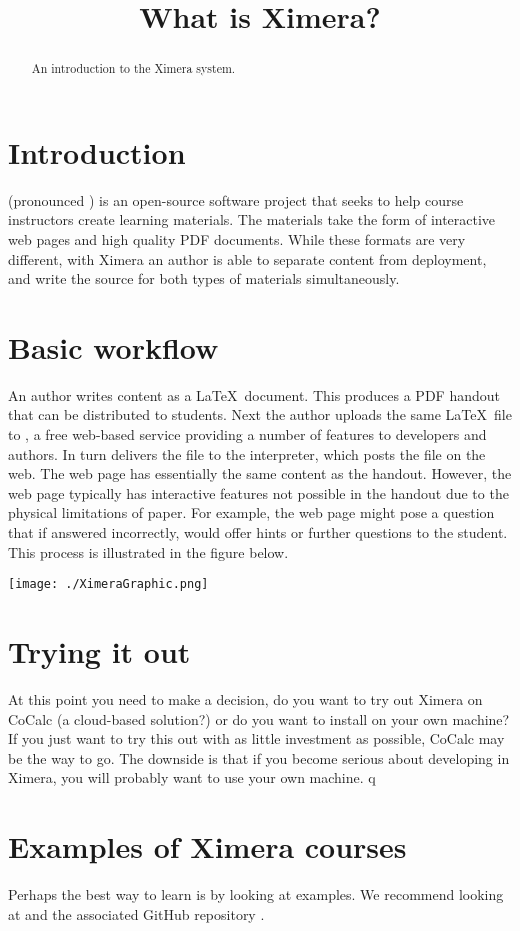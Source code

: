 \documentclass{ximera}
\title{What is Ximera?}
\begin{document}
\begin{abstract}
An introduction to the Ximera system.
\end{abstract}
\maketitle


\section{Introduction}

 (pronounced ) is an
open-source software project that seeks to help course instructors
create learning materials.  The materials take the form of interactive
web pages and high quality PDF documents.  While these formats are
very different, with Ximera an author is able to separate content from
deployment, and write the source for both types of materials
simultaneously.

\section{Basic workflow}

An author writes content as a \LaTeX\ document.  This produces a PDF
handout that can be distributed to students.  Next the author uploads
the same \LaTeX\ file to , a free
web-based service providing a number of features to developers and
authors.  In turn  delivers the
file to the  interpreter, which
  posts the file on the web.  The web page has essentially the same
  content as the handout.  However, the web page typically has
  interactive features not possible in the handout due to the physical
  limitations of paper.  For example, the web page might pose a
  question that if answered incorrectly, would offer hints or further
  questions to the student.  This process is illustrated in the figure
  below.

\begin{image}
\texttt{[image: ./XimeraGraphic.png]}
\end{image}

\section{Trying it out}

At this point you need to make a decision, do you want to try out
Ximera on CoCalc (a cloud-based solution?) or do you want to install
on your own machine?  If you just want to try this out with as little
investment as possible, CoCalc may be the way to go. The downside is
that if you become serious about developing in Ximera, you will
probably want to use your own machine. q

\section{Examples of Ximera courses}

Perhaps the best way to learn is by looking at examples. We recommend
looking at  and the
associated GitHub repository .
\end{document}
